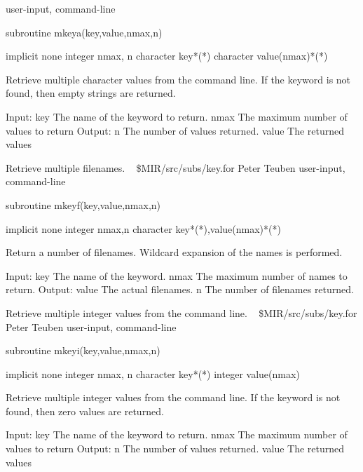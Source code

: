 \newline {} user-input, command-line
\par{\tenpoint
{\eightpoint\begintt
        subroutine mkeya(key,value,nmax,n)

        implicit none
        integer nmax, n
        character key*(*)
        character value(nmax)*(*)

  Retrieve multiple character values from the command line. If the keyword is
  not found, then empty strings are returned. 

  Input:
    key        The name of the keyword to return.
    nmax       The maximum number of values to return
  Output:
    n          The number of values returned.
    value      The returned values
\endtt}
\par}
%
\noindent Retrieve multiple filenames.
\newline \ 
\newline {} \$MIR/src/subs/key.for
\newline {} Peter Teuben
\newline {} user-input, command-line
\par{\tenpoint
{\eightpoint\begintt
        subroutine mkeyf(key,value,nmax,n)

        implicit none
        integer nmax,n
        character key*(*),value(nmax)*(*)

  Return a number of filenames. Wildcard expansion of the names is
  performed.

  Input:
    key        The name of the keyword.
    nmax       The maximum number of names to return.
  Output:
    value      The actual filenames.
    n          The number of filenames returned.
\endtt}
\par}
%
\noindent Retrieve multiple integer values from the command line.
\newline \ 
\newline \abox{File:} \$MIR/src/subs/key.for
\newline {} Peter Teuben
\newline \abox{Keywords:} user-input, command-line
\par{\tenpoint
{\eightpoint\begintt
        subroutine mkeyi(key,value,nmax,n)

        implicit none
        integer nmax, n
        character key*(*)
        integer value(nmax)

  Retrieve multiple integer values from the command line. If the keyword is
  not found, then zero values are returned. 

  Input:
    key        The name of the keyword to return.
    nmax       The maximum number of values to return
  Output:
    n          The number of values returned.
    value      The returned values
\endtt}
\par}
